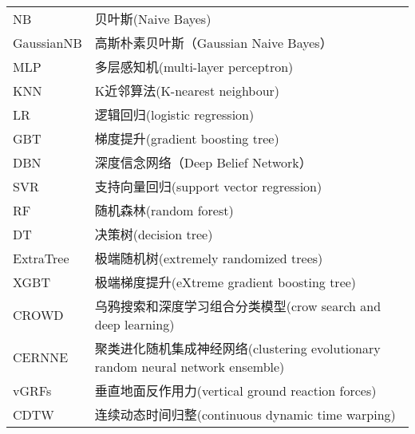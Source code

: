 \begin{longtable}{p{2.5cm}<{\centering}p{10.0cm}<{\centering}}
NB  &贝叶斯(Naive Bayes)      \\
GaussianNB  & 高斯朴素贝叶斯（Gaussian Naive Bayes）    \\
MLP    &多层感知机(multi-layer perceptron)    \\
KNN    &K近邻算法(K-nearest neighbour)    \\
LR    & 逻辑回归(logistic regression)   \\
 GBT   &  梯度提升(gradient boosting tree)  \\
DBN  &  深度信念网络（Deep Belief Network）  \\
  SVR  &  支持向量回归(support vector regression) \\
 RF   &随机森林(random forest)    \\
 DT   & 决策树(decision tree)   \\
ExtraTree  & 极端随机树(extremely randomized trees)    \\
XGBT  &  极端梯度提升(eXtreme gradient boosting tree)   \\
CROWD  & 乌鸦搜索和深度学习组合分类模型(crow search and deep learning)     \\
CERNNE  & 聚类进化随机集成神经网络(clustering evolutionary random neural network ensemble)  \\
vGRFs  & 垂直地面反作用力(vertical ground reaction forces)     \\
CDTW  & 连续动态时间归整(continuous dynamic time warping)     \\
\hline
\end{longtable}
